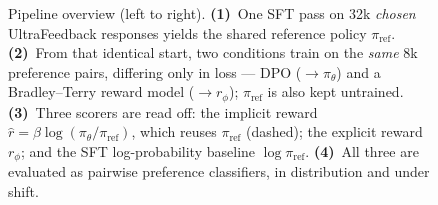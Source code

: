 \documentclass[11pt]{article}
\begin{document}
\begin{figure}[H]
\caption{Pipeline overview (left to right). \textbf{(1)}~One SFT pass on 32k \emph{chosen}
UltraFeedback responses yields the shared reference policy $\pi_{\mathrm{ref}}$. \textbf{(2)}~From
that identical start, two conditions train on the \emph{same} 8k preference pairs, differing only
in loss --- DPO ($\to\pi_\theta$) and a Bradley--Terry reward model ($\to r_\phi$); $\pi_{
\mathrm{ref}}$ is also kept untrained. \textbf{(3)}~Three scorers are read off: the implicit
reward $\hat r=\beta\log(\pi_\theta/\pi_{\mathrm{ref}})$, which reuses $\pi_{\mathrm{ref}}$
(dashed); the explicit reward $r_\phi$; and the SFT log-probability baseline $\log\pi_{\mathrm{
ref}}$. \textbf{(4)}~All three are evaluated as pairwise preference classifiers, in distribution
and under shift.}
\label{fig:pipeline}
\end{figure}
\end{document}
